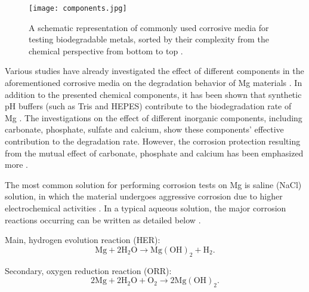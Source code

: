 \begin{figure}
\centering
\medskip
\texttt{[image: components.jpg]}
\caption[Commonly used corrosive media for testing biodegradable metals]{A schematic representation of commonly used corrosive media for testing biodegradable metals, sorted by their complexity from the chemical perspective from bottom to top \cite{Mei2020}.} 
\label{fig:components}
\end{figure}

Various studies have already investigated the effect of different components in the aforementioned corrosive media on the degradation behavior of Mg materials \cite{Mei2019,Zeng2014,Johnston2017, Lamaka2018,Mei2019a}. In addition to the presented chemical components, it has been shown that synthetic pH buffers (such as Tris and HEPES) contribute to the biodegradation rate of Mg \cite{Mei2019}. The investigations on the effect of different inorganic components, including carbonate, phosphate, sulfate and calcium, show these components' effective contribution to the degradation rate. However, the corrosion protection resulting from the mutual effect of carbonate, phosphate and calcium has been emphasized more \cite{Mei2019,Lamaka2018}.




The most common solution for performing corrosion tests on Mg is saline (NaCl) solution, in which the material undergoes aggressive corrosion due to higher electrochemical activities \cite{Hadzima2014,Lu2019}. In a typical aqueous solution, the major corrosion reactions occurring can be written as detailed below \cite{Li2020,Atrens2015}.


Main, hydrogen evolution reaction (\gls{HER}):
\begin{equation}
\mathrm{Mg}+2 \mathrm{H}_{2} \mathrm{O} \rightarrow \mathrm{Mg}(\mathrm{OH})_{2}+\mathrm{H}_{2}.
\end{equation}

Secondary, oxygen reduction reaction (\gls{ORR}):
\begin{equation}
2 \mathrm{Mg}+2 \mathrm{H}_{2} \mathrm{O}+\mathrm{O}_{2} \rightarrow 2 \mathrm{Mg}(\mathrm{OH})_{2}.
\end{equation}

